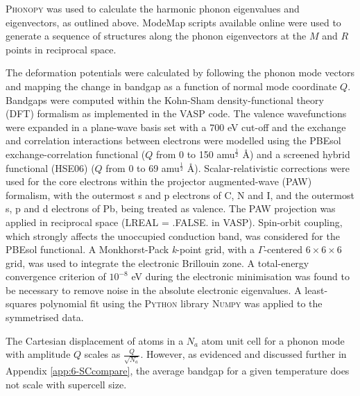 \textsc{Phonopy}\autocite{Togo2015} was used to calculate the harmonic phonon eigenvalues and eigenvectors, as outlined above. ModeMap scripts available online\autocite{ModeMap} were used to generate a sequence of structures along the phonon eigenvectors at the $M$ and $R$ points in reciprocal space. 

The deformation potentials were calculated by following the phonon mode vectors and mapping the change in bandgap as a function of normal mode coordinate $Q$.
Bandgaps were computed within the Kohn-Sham density-functional theory (DFT) formalism as implemented in the \textsc{VASP} code.\autocite{Kresse1996a}
The valence wavefunctions were expanded in a plane-wave basis set with a 700 eV cut-off and the exchange and correlation interactions between electrons were modelled using the PBEsol exchange-correlation functional\autocite{Perdew2008a} ($Q$ from 0 to 150 amu$^{\frac{1}{2}}$ \AA) and a screened hybrid functional (HSE06)\autocite{Heyd2004a,Heyd2005a} ($Q$ from 0 to 69 amu$^{\frac{1}{2}}$ \AA).
Scalar-relativistic corrections were used for the core electrons within the projector augmented-wave (PAW) formalism,\autocite{Blochl1994} with the outermost s and p electrons of C, N and I, and the outermost s, p and d electrons of Pb, being treated as valence. 
The PAW projection was applied in reciprocal space (\textsc{LREAL = .FALSE.} in \textsc{VASP}).
Spin-orbit coupling, which strongly affects the unoccupied conduction band, was considered for the PBEsol functional.
A Monkhorst-Pack \textit{k}-point grid, with a $\Gamma$-centered $6 \times 6 \times 6$ grid, was used to integrate the electronic Brillouin zone.
A total-energy convergence criterion of $10^{-8}$ eV during the electronic minimisation was found to be necessary to remove noise in the absolute electronic eigenvalues.
A least-squares polynomial fit using the \textsc{Python} library \textsc{Numpy} was applied to the symmetrised data.

The Cartesian displacement of atoms in a $N_a$ atom unit cell for a phonon mode with amplitude $Q$ scales as $\frac{Q}{\sqrt{N_a}}$. %
However, as evidenced and discussed further in Appendix \ref{app:6-SCcompare}, the average bandgap for a given temperature does not scale with supercell size.

